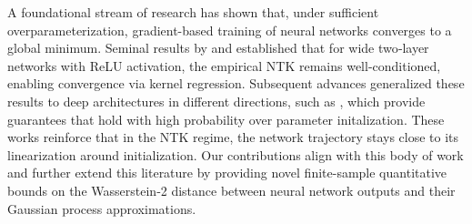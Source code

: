 \documentclass{article}
\theoremstyle{definition}
\theoremstyle{remark}
\numberwithin{equation}{section}
\begin{document}
A foundational stream of research has shown that, under sufficient overparameterization, gradient-based training of neural networks converges to a global minimum. 
Seminal results by \cite{du2019gradientflow} and \cite{Arora2019Fine} established that for wide two‑layer networks with ReLU activation, the empirical NTK remains well-conditioned, enabling convergence via kernel regression. 
Subsequent advances generalized these results to deep architectures in different directions, such as \cite{allen2019_convergence,zou2019_improved,sankararaman2020_confusion,wu2019,wei_lee_liu,Zou2020},
which provide guarantees that hold with high probability over parameter initalization.
These works reinforce that in the NTK regime, the network trajectory stays close to its linearization around initialization. 
Our contributions align with this body of work 
and further extend this literature by providing novel finite-sample quantitative bounds on the Wasserstein‑2 distance between neural network outputs and their Gaussian process approximations.


\end{document}
